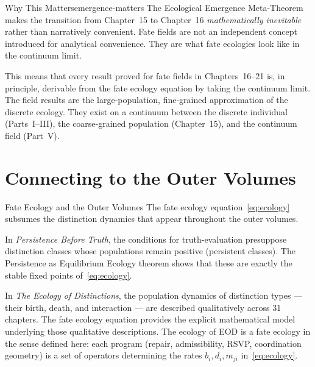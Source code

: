 \documentclass[12pt,twoside,openright]{book}
\begin{document}
\begin{remark}{Why This Matters}{emergence-matters}
The Ecological Emergence Meta-Theorem makes the transition from
Chapter~15 to Chapter~16 \emph{mathematically inevitable}
rather than narratively convenient. Fate fields are not an
independent concept introduced for analytical convenience.
They are what fate ecologies look like in the continuum limit.

This means that every result proved for fate fields in
Chapters~16--21 is, in principle, derivable from the fate
ecology equation by taking the continuum limit. The field
results are the large-population, fine-grained approximation
of the discrete ecology. They exist on a continuum between
the discrete individual (Parts~I--III), the coarse-grained
population (Chapter~15), and the continuum field (Part~V).
\end{remark}

\section{Connecting to the Outer Volumes}

\begin{trilogylink}{Fate Ecology and the Outer Volumes}
The fate ecology equation~\eqref{eq:ecology} subsumes the
distinction dynamics that appear throughout the outer volumes.

In \textit{Persistence Before Truth}, the conditions for
truth-evaluation presuppose distinction classes whose
populations remain positive (persistent classes). The
Persistence as Equilibrium Ecology theorem shows that these
are exactly the stable fixed points of~\eqref{eq:ecology}.

In \textit{The Ecology of Distinctions}, the population
dynamics of distinction types --- their birth, death, and
interaction --- are described qualitatively across 31 chapters.
The fate ecology equation provides the explicit mathematical
model underlying those qualitative descriptions. The ecology
of EOD is a fate ecology in the sense defined here: each
program (repair, admissibility, RSVP, coordination geometry)
is a set of operators determining the rates $b_i, d_i, m_{ji}$
in~\eqref{eq:ecology}.
\end{trilogylink}
\end{document}
